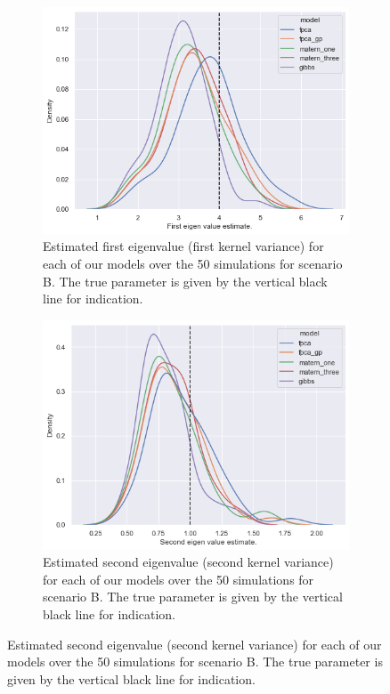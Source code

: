\begin{figure}
	\centering
	\begin{subfigure}[b]{0.45\textwidth}
		\includegraphics[width=\textwidth]{lambda_1_param_B}
		\caption{Estimated first eigenvalue (first kernel variance) for each of our models over the 50 simulations for scenario B. The true parameter is given by the vertical black line for indication.}
		\label{fig:lambda_1_param_B}
	\end{subfigure}
	\hfill
	\begin{subfigure}[b]{0.45\textwidth}
		\includegraphics[width=\textwidth]{lambda_2_param_B}
		\caption{Estimated second eigenvalue (second kernel variance) for each of our models over the 50 simulations for scenario B. The true parameter is given by the vertical black line for indication.}
		\label{fig:lambda_2_param_B}
	\end{subfigure}
\end{figure}

